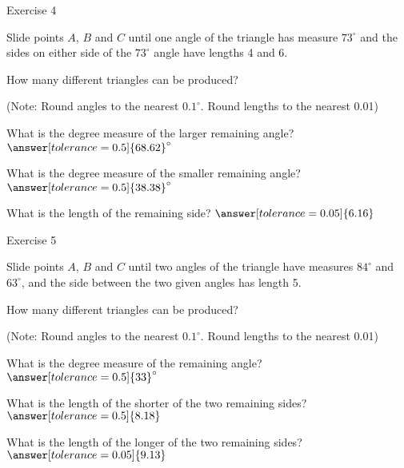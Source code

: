 \documentclass[number]{ximera}
\begin{document}
\bigskip

Exercise 4

Slide points $A$, $B$ and $C$ until one angle of the triangle has measure $73^\circ$ and the sides on either side of the $73^\circ$ angle have lengths 4 and 6.

\begin{question}
How many different triangles can be produced?
\begin{multipleChoice}
\end{multipleChoice}
\begin{question}
(Note: Round angles to the nearest $0.1^\circ$. Round lengths to the nearest 0.01)

What is the degree measure of the larger remaining angle? $\answer[tolerance=0.5]{68.62}^\circ$

What is the degree measure of the smaller remaining angle? $\answer[tolerance=0.5]{38.38}^\circ$

What is the length of the remaining side? $\answer[tolerance=0.05]{6.16}$
\end{question}
\end{question}

Exercise 5

Slide points $A$, $B$ and $C$ until two angles of the triangle have measures $84^\circ$ and $63^\circ$, and the side between the two given angles has length 5.

\begin{question}
How many different triangles can be produced?
\begin{multipleChoice}
\end{multipleChoice}
\begin{question}
(Note: Round angles to the nearest $0.1^\circ$. Round lengths to the nearest 0.01)

What is the degree measure of the remaining angle? $\answer[tolerance=0.5]{33}^\circ$

What is the length of the shorter of the two remaining sides? $\answer[tolerance=0.5]{8.18}$

What is the length of the longer of the two remaining sides? $\answer[tolerance=0.05]{9.13}$
\end{question}
\end{question}
\end{document}
